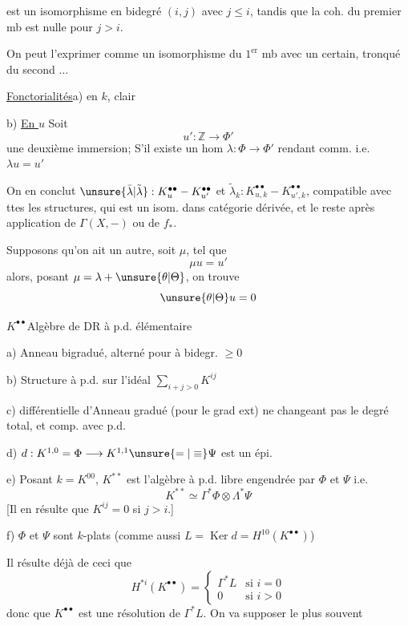 est un isomorphisme  en bidegré $(i,j)$ avec $j\leq i$,
tandis que la coh. du premier mb est nulle pour $j>i$.

On peut l'exprimer comme un isomorphisme du $1^{\mathrm{er}}$ mb avec un certain,
tronqué du second $\ldots$

\uline{Fonctorialités}\quad a) en $k$, clair

b) \uline{En $u$} Soit
\[
u':\mathbb Z\longrightarrow\Phi'
\]
une deuxième immersion; S'il existe un hom $\lambda:\Phi\longrightarrow\Phi'$
rendant comm.
i.e. $\lambda u=u'$

On en conclut $\unsure{\bar\lambda|\tilde\lambda}:K_u^{\bullet\bullet}-K_{u'}^{\bullet\bullet}$
et $\tilde\lambda_k:K_{u,k}^{\bullet\bullet}-K_{u',k}^{\bullet\bullet}$,
compatible avec ttes les structures, qui est un isom. dans 
catégorie dérivée, et le reste après application de $\Gamma(X,-)$ ou de $f_*$.

Supposons qu'on ait un autre, soit $\mu$, tel que
\[
\mu u=u'
\]
alors, posant $\mu=\lambda+\unsure{\theta|\Theta}$,
on trouve
\[
\unsure{\theta|\Theta}u=0
\]

$K^{\bullet\bullet}$\quad Algèbre de DR à p.d. élémentaire

a) Anneau bigradué,  alterné pour
 à bidegr. $\geq0$

b) 
Structure à p.d. sur l'idéal $\sum_{i+j>0}K^{ij}$

c) différentielle d'Anneau gradué (pour le grad ext) ne changeant pas le degré total, et comp. avec p.d.

d) $d:K^{1,0}=\Phi\longrightarrow K^{1,1}\unsure{=|\equiv}\Psi$ est un épi.

e) Posant $k=K^{00}$, $K^{**}$ est l'algèbre  à p.d. libre engendrée par $\Phi$ et $\Psi$
i.e.
\[
K^{**}\simeq\Gamma^*\Phi\otimes\Lambda^*\Psi
\]
[Il en résulte que $K^{ij}=0$ si $j>i$.]

f)  $\Phi$ et $\Psi$ sont $k$-plats
(comme aussi $L=\operatorname{Ker}d=H^{10}(K^{\bullet\bullet})$)

Il résulte déjà de ceci que
\[
H^{*i}(K^{\bullet\bullet})=
\begin{cases}
\Gamma^*L&\text{si }i=0\\
0&\text{si }i>0
\end{cases}
\]
donc que $K^{\bullet\bullet}$ est une résolution de $\Gamma^*L$.
On va supposer le plus souvent

